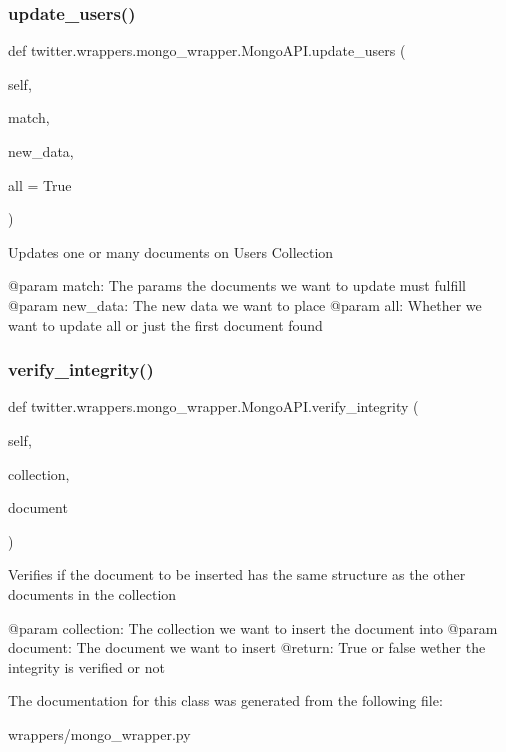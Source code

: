\subsubsection{\texorpdfstring{update\+\_\+users()}{update\_users()}}
{\footnotesize\ttfamily def twitter.\+wrappers.\+mongo\+\_\+wrapper.\+Mongo\+A\+P\+I.\+update\+\_\+users (\begin{DoxyParamCaption}\item[{}]{self,  }\item[{}]{match,  }\item[{}]{new\+\_\+data,  }\item[{}]{all = {\ttfamily True} }\end{DoxyParamCaption})}

\begin{DoxyVerb}Updates one or many documents on Users Collection

@param match: The params the documents we want to update must fulfill
@param new_data: The new data we want to place
@param all: Whether we want to update all or just the first document found
\end{DoxyVerb}
 \mbox{\label{classtwitter_1_1wrappers_1_1mongo__wrapper_1_1MongoAPI_ad1adb6d5aa5e20cc43b77ab11d6403a3}} 
\subsubsection{\texorpdfstring{verify\+\_\+integrity()}{verify\_integrity()}}
{\footnotesize\ttfamily def twitter.\+wrappers.\+mongo\+\_\+wrapper.\+Mongo\+A\+P\+I.\+verify\+\_\+integrity (\begin{DoxyParamCaption}\item[{}]{self,  }\item[{}]{collection,  }\item[{}]{document }\end{DoxyParamCaption})}

\begin{DoxyVerb}Verifies if the document to be inserted has the same structure as the other documents in the collection

@param collection: The collection we want to insert the document into
@param document: The document we want to insert
@return: True or false wether the integrity is verified or not
\end{DoxyVerb}
 

The documentation for this class was generated from the following file\+:\begin{DoxyCompactItemize}
\item 
wrappers/mongo\+\_\+wrapper.\+py\end{DoxyCompactItemize}
